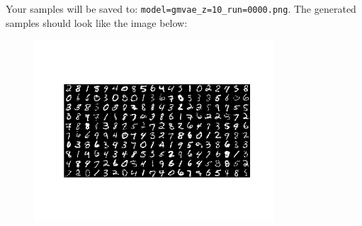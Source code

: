 \begin{enumerate}[label=(\alph*)]
    Your samples will be saved to: \texttt{model=gmvae\_z=10\_run=0000.png}. The generated samples should look like the image below:

    \begin{figure}[h]
        \centering
        \includegraphics[width=0.8\textwidth]{./figures/gmvae_gen}
    \end{figure}

\end{enumerate}